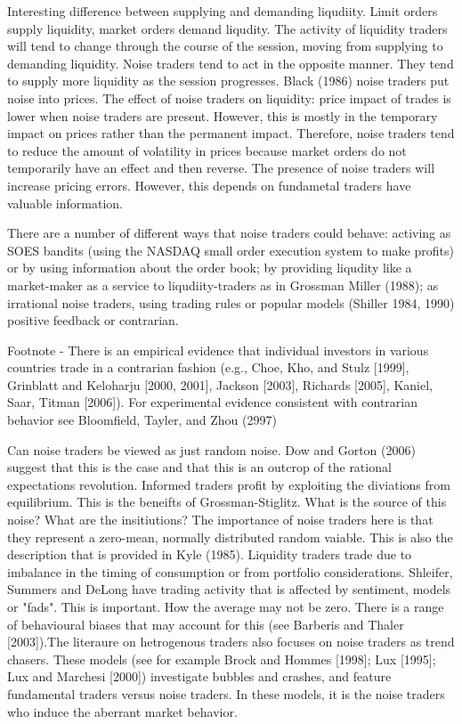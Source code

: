 \documentclass[12pt, a4paper, oneside]{article}\usepackage[]{graphicx}\usepackage[]{color}
\begin{document}
Interesting difference between supplying and demanding liqudiity.  Limit orders supply liquidity, market orders demand liqudity.  The activity of liquidity traders will tend to change through the course of the session, moving from supplying to demanding liquidity. Noise traders tend to act in the opposite manner.  They tend to supply more liquidity as the session progresses. Black (1986) noise traders put noise into prices.  The effect of noise traders on liquidity: price impact of trades is lower when noise traders are present.  However, this is mostly in the temporary impact on prices rather than the permanent impact. Therefore, noise traders tend to reduce the amount of volatility in prices because market orders do not temporarily have an effect and then reverse.  The presence of noise traders will increase pricing errors. However, this depends on fundametal traders have valuable information. 

There are a number of different ways that noise traders could behave:  activing as SOES bandits (using the NASDAQ small order execution system to make profits) or by using information about the order book; by providing liqudity like a market-maker as a service to liqudiity-traders as in Grossman Miller (1988);  as irrational noise traders, using trading rules or popular models (Shiller 1984, 1990) positive feedback or contrarian.  

Footnote -  There is an empirical evidence that individual investors in various countries trade in a contrarian fashion (e.g., Choe, Kho, and Stulz [1999], Grinblatt and Keloharju [2000, 2001], Jackson [2003], Richards [2005], Kaniel, Saar, Titman [2006]). For experimental evidence consistent with contrarian behavior see 
Bloomfield, Tayler, and Zhou (2997)

Can noise traders be viewed as just random noise.  Dow and Gorton (2006) suggest that this is the case and that this is an outcrop of the rational expectations revolution. Informed traders profit by exploiting the diviations from equilibrium. This is the beneifts of Grossman-Stiglitz. What is the source of this noise?  What are the insitiutions? The importance of noise traders here is that they represent a zero-mean, normally distributed random vaiable.  This is also the description that is provided in Kyle (1985).  Liquidity traders trade due to imbalance in the timing of consumption or from portfolio considerations. Shleifer, Summers and DeLong have trading activity that is affected by sentiment, models or "fads".  This is important.  How the average may not be zero. There is a range of behavioural biases that may account for this (see Barberis and Thaler [2003]).The literaure on hetrogenous traders also focuses on noise traders as trend chasers.  These models (see 
for example Brock and Hommes [1998]; Lux [1995]; Lux and Marchesi [2000]) investigate bubbles and 
crashes, and feature fundamental traders versus noise traders. In these models, it is the noise traders who 
induce the aberrant market behavior.  
\end{document}
